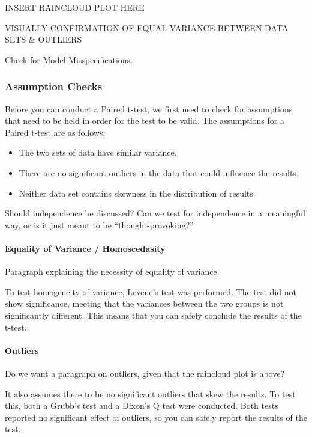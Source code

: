 \documentclass[
]{article}
\providecommand{\tightlist}{%
  \setlength{\itemsep}{0pt}\setlength{\parskip}{0pt}}
\begin{document}
INSERT RAINCLOUD PLOT HERE

VISUALLY CONFIRMATION OF EQUAL VARIANCE BETWEEN DATA SETS \& OUTLIERS

Check for Model Misspecifications.

\hypertarget{assumption-checks}{%
\subsubsection{Assumption Checks}\label{assumption-checks}}

Before you can conduct a Paired t-test, we first need to check for
assumptions that need to be held in order for the test to be valid. The
assumptions for a Paired t-test are as follows:

\begin{itemize}
\tightlist
\item
  The two sets of data have similar variance.
\item
  There are no significant outliers in the data that could influence the
  results.
\item
  Neither data set contains skewness in the distribution of results.
\end{itemize}

Should independence be discussed? Can we test for independence in a
meaningful way, or is it just meant to be ``thought-provoking?''

\hypertarget{equality-of-variance-homoscedasity}{%
\paragraph{Equality of Variance /
Homoscedasity}\label{equality-of-variance-homoscedasity}}

{Paragraph explaining the necessity of equality of variance}

To test homogeneity of variance, Levene's test was performed. The test
did not show significance, meeting that the variances between the two
groups is not significantly different. This means that you can safely
conclude the results of the t-test.

\hypertarget{outliers}{%
\paragraph{Outliers}\label{outliers}}

{Do we want a paragraph on outliers, given that the raincloud plot is
above?}

It also assumes there to be no significant outliers that skew the
results. To test this, both a Grubb's test and a Dixon's Q test were
conducted. Both tests reported no significant effect of outliers, so you
can safely report the results of the test.
\end{document}
